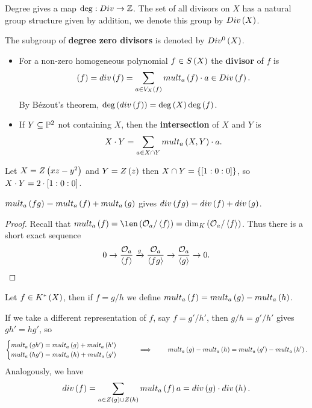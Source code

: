 \begin{remark}
Degree gives a map $ \deg : Div \to \Z $. The set of all divisors on $ X $ has a natural group structure given by addition, we denote this group by $ Div\rb{X} $.
\end{remark}

\begin{notation}
The subgroup of \textbf{degree zero divisors} is denoted by $ Div^0\rb{X} $.
\end{notation}

\begin{definition}
\hfill
\begin{itemize}
\item For a non-zero homogeneous polynomial $ f \in S\rb{X} $ the \textbf{divisor} of $ f $ is
$$ \rb{f} = div\rb{f} = \sum_{a \in V_X\rb{f}} mult_a\rb{f} \cdot a \in Div\rb{f}. $$
By B\'ezout's theorem, $ \deg\rb{div\rb{f}} = \deg\rb{X}\deg\rb{f} $.
\item If $ Y \subseteq \P^2 $ not containing $ X $, then the \textbf{intersection} of $ X $ and $ Y $ is
$$ X \cdot Y = \sum_{a \in X \cap Y} mult_a\rb{X, Y} \cdot a. $$
\end{itemize}
\end{definition}

\begin{example}
Let $ X = Z\rb{xz - y^2} $ and $ Y = Z\rb{z} $ then $ X \cap Y = \cb{\sb{1 : 0 : 0}} $, so $ X \cdot Y = 2 \cdot \sb{1 : 0 : 0} $.
\end{example}

\begin{lemma}
$ mult_a\rb{fg} = mult_a\rb{f} + mult_a\rb{g} $ gives $ div\rb{fg} = div\rb{f} + div\rb{g} $.
\end{lemma}

\begin{proof}
Recall that $ mult_a\rb{f} = \len\rb{\OO_a / \ab{f}} = \dim_K\rb{\OO_a / \ab{f}} $. Thus there is a short exact sequence
$$ 0 \to \dfrac{\OO_a}{\ab{f}} \xrightarrow{g} \dfrac{\OO_a}{\ab{fg}} \to \dfrac{\OO_a}{\ab{g}} \to 0. $$
\end{proof}

\begin{definition}
Let $ f \in K^*\rb{X} $, then if $ f = g / h $ we define $ mult_a\rb{f} = mult_a\rb{g} - mult_a\rb{h} $.
\end{definition}

If we take a different representation of $ f $, say $ f = g' / h' $, then $ g / h = g' / h' $ gives $ gh' = hg' $, so
$$
\begin{cases}
mult_a\rb{gh'} = mult_a\rb{g} + mult_a\rb{h'} \\
mult_a\rb{hg'} = mult_a\rb{h} + mult_a\rb{g'}
\end{cases}
\qquad \implies \qquad mult_a\rb{g} - mult_a\rb{h} = mult_a\rb{g'} - mult_a\rb{h'}. $$
Analogously, we have
$$ div\rb{f} = \sum_{a \in Z\rb{g} \cup Z\rb{h}} mult_a\rb{f}a = div\rb{g} \cdot div\rb{h}. $$


